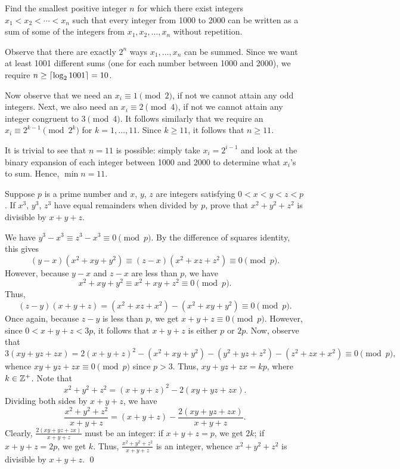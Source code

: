 \begin{question}[11]\label{Q::2024-S-2-3}
    Find the smallest positive integer $n$ for which there exist integers $x_1 < x_2 < \cdots < x_n$ such that every integer from 1000 to 2000 can be written as a sum of some of the integers from $x_1, x_2, \ldots, x_n$ without repetition.
\end{question}
\begin{solution*}
    Observe that there are exactly $2^n$ ways $x_1, \ldots, x_n$ can be summed. Since we want at least 1001 different sums (one for each number between 1000 and 2000), we require $n \geq \left\lceil \log_2 1001 \right\rceil = 10$.

    Now observe that we need an $x_i \equiv 1 \pmod{2}$, if not we cannot attain any odd integers. Next, we also need an $x_i \equiv 2 \pmod{4}$, if not we cannot attain any integer congruent to $3 \pmod{4}$. It follows similarly that we require an $x_i \equiv 2^{k-1} \pmod{2^k}$ for $k = 1, \ldots, 11$. Since $k \geq 11$, it follows that $n \geq 11$.

    It is trivial to see that $n = 11$ is possible: simply take $x_i = 2^{i-1}$ and look at the binary expansion of each integer between 1000 and 2000 to determine what $x_i$'s to sum. Hence, $\min n = 11$.
\end{solution*}

\begin{question}\label{Q::2024-S-2-4}
    Suppose $p$ is a prime number and $x$, $y$, $z$ are integers satisfying $0 < x < y < z < p$. If $x^3$, $y^3$, $z^3$ have equal remainders when divided by $p$, prove that $x^2 + y^2 + z^2$ is divisible by $x + y + z$.
\end{question}

\begin{solution*}
    We have $y^3 - x^3 \equiv z^3 - x^3 \equiv 0 \pmod{p}$. By the difference of squares identity, this gives \[(y-x)(x^2 + xy + y^2) \equiv (z-x)(x^2 + xz + z^2) \equiv 0 \pmod{p}.\] However, because $y - x$ and $z - x$ are less than $p$, we have \[x^2 + xy + y^2 \equiv x^2 + xy + z^2 \equiv 0 \pmod{p}.\] Thus, \[(z-y)(x + y + z) = (x^2 + xz + x^2) - (x^2 + xy + y^2) \equiv 0 \pmod{p}.\] Once again, because $z - y$ is less than $p$, we get $x + y + z \equiv 0 \pmod{p}$. However, since $0 < x + y + z < 3p$, it follows that $x + y + z$ is either $p$ or $2p$. Now, observe that \[3(xy + yz + zx) = 2(x + y + z)^2 - (x^2 + xy + y^2) - (y^2 + yz + z^2) - (z^2 + zx + x^2) \equiv 0 \pmod{p},\] whence $xy + yz + zx \equiv 0 \pmod{p}$ since $p > 3$. Thus, $xy + yz + zx = kp$, where $k \in \mathbb{Z}^+$. Note that \[x^2 + y^2 + z^2 = (x + y + z)^2 - 2(xy + yz + zx).\] Dividing both sides by $x + y + z$, we have \[\frac{x^2 + y^2 + z^2}{x + y + z} = (x + y + z) - \frac{2(xy + yz + zx)}{x + y + z}.\] Clearly, $\frac{2(xy + yz + zx)}{x + y + z}$ must be an integer: if $x + y + z = p$, we get $2k$; if $x + y + z = 2p$, we get $k$. Thus, $\frac{x^2 + y^2 + z^2}{x + y + z}$ is an integer, whence $x^2 + y^2 + z^2$ is divisible by $x + y + z$. \qed 
\end{solution*}

